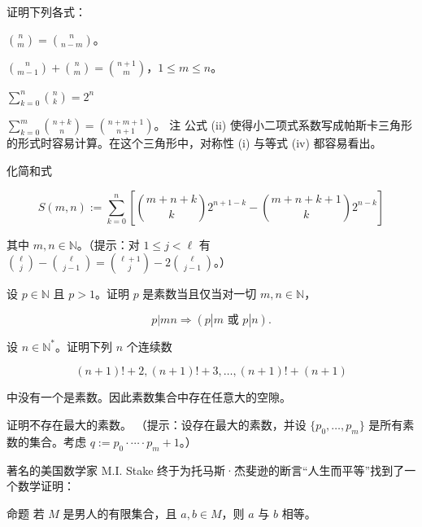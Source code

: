 \begin{exercises}
\begin{items}
证明下列各式：

\end{items}

\begin{subitems}
\item

$ \binom{n}{m} = \binom{n}{n-m} $。

\item

$ \binom{n}{m-1} + \binom{n}{m} = \binom{n+1}{m} $，$ 1 \leq m \leq n $。

\item

$ \sum_{k=0}^{n}\binom{n}{k}=2^{n} $

\item

$ \sum_{k=0}^{m}\binom{n+k}{n} = \binom{n+m+1}{n+1} $。
注 公式 (ii) 使得小二项式系数写成帕斯卡三角形的形式时容易计算。在这个三角形中，对称性 (i) 与等式 (iv) 都容易看出。


\end{subitems}

\item

化简和式

\[
S(m,n):=\sum_{k=0}^{n}\left[\binom{m+n+k}{k}2^{n+1-k}-\binom{m+n+k+1}{k}2^{n-k}\right]
\]

其中 $ m, n \in \mathbb{N} $。（提示：对 $ 1 \leq j < \ell $ 有 $ \binom{\ell}{j} - \binom{\ell}{j-1} = \binom{\ell+1}{j} - 2 \binom{\ell}{j-1} $。）

\item

设 $ p \in \mathbb{N} $ 且 $ p > 1 $。证明 $ p $ 是素数当且仅当对一切 $ m, n \in \mathbb{N} $，

\[
p\left|m n\right.\Rightarrow\left(p\left|m\text{ 或 }p\right|n\right).
\]
\item

\begin{items}
\item

设 $ n \in \mathbb{N}^* $。证明下列 $ n $ 个连续数

\begin{equation}
(n+1)!+2,(n+1)!+3,\ldots,(n+1)!+(n+1)
\end{equation}

中没有一个是素数。因此素数集合中存在任意大的空隙。

\item

证明不存在最大的素数。
（提示：设存在最大的素数，并设 $\{p_0, \ldots, p_m\}$ 是所有素数的集合。考虑 $q := p_0 \cdot \cdots \cdot p_m + 1$。）

\end{items}

\item

著名的美国数学家 M.I. Stake 终于为托马斯·杰斐逊的断言“人生而平等”找到了一个数学证明：

命题 若 $M$ 是男人的有限集合，且 $a,b \in M$，则 $a$ 与 $b$ 相等。

\end{exercises}
